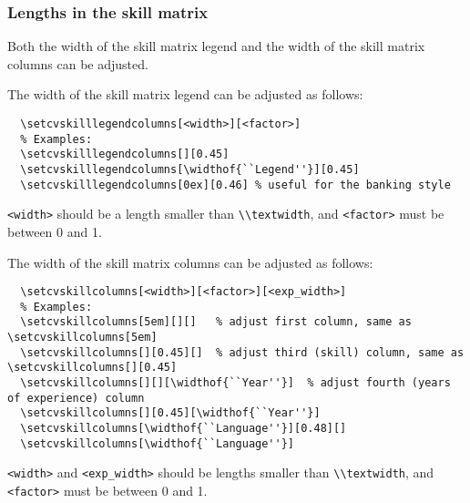 \documentclass[a4paper, 11pt]{article}
\newcommand{\code}[1]{\lstinline!#1!}
\begin{document}


\subsubsection{Lengths in the skill matrix}
\label{section:length:skillmatrix}
Both the width of the skill matrix legend and the width of the skill matrix columns can be adjusted.

The width of the skill matrix legend can be adjusted as follows:
\begin{lstlisting}
  \setcvskilllegendcolumns[<width>][<factor>]
  % Examples:
  \setcvskilllegendcolumns[][0.45]
  \setcvskilllegendcolumns[\widthof{``Legend''}][0.45]
  \setcvskilllegendcolumns[0ex][0.46] % useful for the banking style
\end{lstlisting}
\code{<width>} should be a length smaller than \code{\\textwidth}, and \code{<factor>} must be between 0 and 1.

The width of the skill matrix columns can be adjusted as follows:
\begin{lstlisting}
  \setcvskillcolumns[<width>][<factor>][<exp_width>]
  % Examples:
  \setcvskillcolumns[5em][][]   % adjust first column, same as \setcvskillcolumns[5em]
  \setcvskillcolumns[][0.45][]  % adjust third (skill) column, same as \setcvskillcolumns[][0.45]
  \setcvskillcolumns[][][\widthof{``Year''}]  % adjust fourth (years of experience) column
  \setcvskillcolumns[][0.45][\widthof{``Year''}]
  \setcvskillcolumns[\widthof{``Language''}][0.48][]
  \setcvskillcolumns[\widthof{``Language''}]
\end{lstlisting}
\code{<width>} and \code{<exp_width>} should be lengths smaller than \code{\\textwidth}, and \code{<factor>} must be between 0 and 1.
\end{document}
